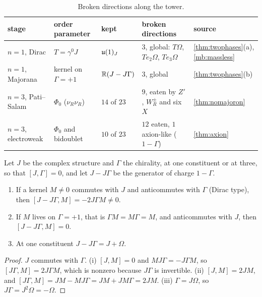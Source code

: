 \begin{table}[t]
\centering
\small
\begin{tabular}{@{}>{\raggedright\arraybackslash}p{2.4cm}>{\raggedright\arraybackslash}p{2.3cm}>{\raggedright\arraybackslash}p{1.7cm}>{\raggedright\arraybackslash}p{4.4cm}>{\raggedright\arraybackslash}p{3.0cm}@{}}
\toprule
stage & order parameter & kept & broken directions & source\\
\midrule
$n=1$, Dirac & $T=\gamma^0J$ & $\mathfrak{u}(1)_J$ & $3$, global: $T\Omega$, $Te_2\Omega$, $Te_3\Omega$ & \cref{thm:twophases}(a), \cref{mb:massless}\\
$n=1$, Majorana & kernel on $\Gamma=+1$ & $\mathbb{R}(J-J\Gamma)$ & $3$, global & \cref{thm:twophases}(b)\\
$n=3$, Pati--Salam & $\Phi_0$ ($\nu_R\nu_R$) & $14$ of $23$ & $9$, eaten by $Z'$, $W_R^\pm$ and six $X$ & \cref{thm:nomajoron}\\
$n=3$, electroweak & $\Phi_0$ and bidoublet & $10$ of $23$ & $12$ eaten, $1$ axion-like ($1-\Gamma$) & \cref{thm:axion}\\
\bottomrule
\end{tabular}
\caption{Broken directions along the tower.}
\label{mb:tab:goldstone}
\end{table}

\begin{lemma}
\label{mb:oneminusGamma}
Let $J$ be the complex structure and $\Gamma$ the chirality, at one constituent or at three, so that $[J,\Gamma]=0$, and let $J-J\Gamma$ be the generator of charge $1-\Gamma$.
\begin{enumerate}[label=(\roman*),leftmargin=2.2em]
\item If a kernel $M\neq0$ commutes with $J$ and anticommutes with $\Gamma$ (Dirac type), then $[J-J\Gamma,M]=-2J\Gamma M\neq0$.
\item If $M$ lives on $\Gamma=+1$, that is $\Gamma M=M\Gamma=M$, and anticommutes with $J$, then $[J-J\Gamma,M]=0$.
\item At one constituent $J-J\Gamma=J+\Omega$.
\end{enumerate}
\end{lemma}

\begin{proof}
$J$ commutes with $\Gamma$. (i) $[J,M]=0$ and $MJ\Gamma=-J\Gamma M$, so $[J\Gamma,M]=2J\Gamma M$, which is nonzero because $J\Gamma$ is invertible.
(ii) $[J,M]=2JM$, and $[J\Gamma,M]=JM-MJ\Gamma=JM+JM\Gamma=2JM$. (iii) $\Gamma=J\Omega$, so $J\Gamma=J^2\Omega=-\Omega$.
\end{proof}

